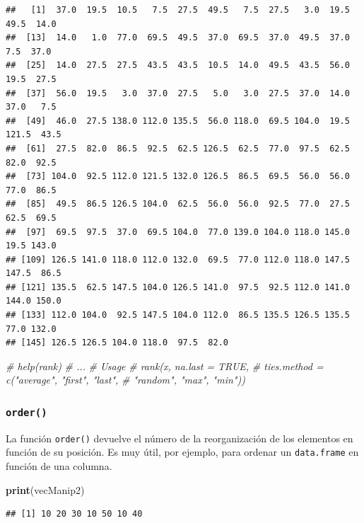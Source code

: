 \documentclass[
]{book}
\newenvironment{Shaded}{\begin{snugshade}}{\end{snugshade}}
\newcommand{\CommentTok}[1]{\textcolor[rgb]{0.56,0.35,0.01}{\textit{#1}}}
\newcommand{\KeywordTok}[1]{\textcolor[rgb]{0.13,0.29,0.53}{\textbf{#1}}}
\newcommand{\NormalTok}[1]{#1}
\begin{document}
\begin{verbatim}
##   [1]  37.0  19.5  10.5   7.5  27.5  49.5   7.5  27.5   3.0  19.5  49.5  14.0
##  [13]  14.0   1.0  77.0  69.5  49.5  37.0  69.5  37.0  49.5  37.0   7.5  37.0
##  [25]  14.0  27.5  27.5  43.5  43.5  10.5  14.0  49.5  43.5  56.0  19.5  27.5
##  [37]  56.0  19.5   3.0  37.0  27.5   5.0   3.0  27.5  37.0  14.0  37.0   7.5
##  [49]  46.0  27.5 138.0 112.0 135.5  56.0 118.0  69.5 104.0  19.5 121.5  43.5
##  [61]  27.5  82.0  86.5  92.5  62.5 126.5  62.5  77.0  97.5  62.5  82.0  92.5
##  [73] 104.0  92.5 112.0 121.5 132.0 126.5  86.5  69.5  56.0  56.0  77.0  86.5
##  [85]  49.5  86.5 126.5 104.0  62.5  56.0  56.0  92.5  77.0  27.5  62.5  69.5
##  [97]  69.5  97.5  37.0  69.5 104.0  77.0 139.0 104.0 118.0 145.0  19.5 143.0
## [109] 126.5 141.0 118.0 112.0 132.0  69.5  77.0 112.0 118.0 147.5 147.5  86.5
## [121] 135.5  62.5 147.5 104.0 126.5 141.0  97.5  92.5 112.0 141.0 144.0 150.0
## [133] 112.0 104.0  92.5 147.5 104.0 112.0  86.5 135.5 126.5 135.5  77.0 132.0
## [145] 126.5 126.5 104.0 118.0  97.5  82.0
\end{verbatim}

\begin{Shaded}
\begin{Highlighting}[]
\CommentTok{# help(rank)}
\CommentTok{# ...}
\CommentTok{# Usage}
\CommentTok{# rank(x, na.last = TRUE,}
\CommentTok{#     ties.method = c("average", "first", "last", }
\CommentTok{#       "random", "max", "min"))}
\end{Highlighting}
\end{Shaded}

\hypertarget{l015order}{%
\subsubsection{\texorpdfstring{\texttt{order()}}{order()}}\label{l015order}}

La función \texttt{order()} devuelve el número de la reorganización de los elementos en función de su posición. Es muy útil, por ejemplo, para ordenar un \texttt{data.frame} en función de una columna.

\begin{Shaded}
\begin{Highlighting}[]
\KeywordTok{print}\NormalTok{(vecManip2)}
\end{Highlighting}
\end{Shaded}

\begin{verbatim}
## [1] 10 20 30 10 50 10 40
\end{verbatim}
\end{document}
